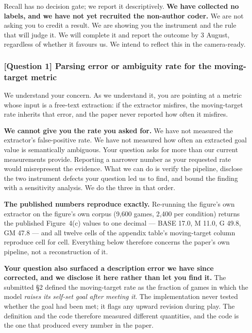 Recall has no decision gate; we report it descriptively.
\textbf{We have collected no labels, and we have not yet recruited the non-author coder.}
We are not asking you to credit a result. We are showing you the instrument and the rule that will
judge it. We will complete it and report the outcome by 3 August, regardless of whether it favours
us. We intend to reflect this in the camera-ready.

\subsubsection*{\textbf{[Question 1]} Parsing error or ambiguity rate for the moving-target metric}

We understand your concern. As we understand it, you are pointing at a metric whose input is a
free-text extraction: if the extractor misfires, the moving-target rate inherits that error, and
the paper never reported how often it misfires.

\textbf{We cannot give you the rate you asked for.} We have not measured the extractor's false-positive rate.
We have not measured how often an extracted goal value is semantically ambiguous.
Your question asks for more than our current measurements provide.
Reporting a narrower number as your requested rate would misrepresent the evidence.
What we can do is verify the pipeline, disclose the two instrument defects your question led us
to find, and bound the finding with a sensitivity analysis. We do the three in that order.

\textbf{The published numbers reproduce exactly.} Re-running the figure's own extractor on the
figure's own corpus (9,600 games, 2,400 per condition) returns the published Figure~4(c) values
to one decimal --- BASE 17.0, M 11.0, G 49.8, GM 47.8 --- and all twelve cells of the appendix
table's moving-target column reproduce cell for cell. Everything below therefore concerns the
paper's own pipeline, not a reconstruction of it.

\textbf{Your question also surfaced a description error we have since corrected, and we disclose
it here rather than let you find it.} The submitted §2 defined the moving-target rate as the
fraction of games in which the model \emph{raises its self-set goal after meeting it}. The
implementation never tested whether the goal had been met; it flags any upward revision during
play. The definition and the code therefore measured different quantities, and the code is the one
that produced every number in the paper.

